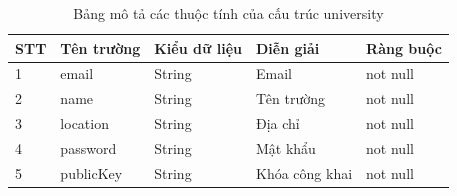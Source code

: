 \begin{table}[H]
\caption{Bảng mô tả các thuộc tính của cấu trúc university}
	\label{table:university}
	\begin{tabularx} {\textwidth} {|p{1cm}|p{3cm}|p{3cm}|X|p{2cm}|}
\hline
		STT &	Tên trường & Kiểu dữ liệu & Diễn giải & Ràng buộc \\ \hline
		1 & email	& String & Email  & not null \\ \hline
		2 & name & String  & Tên trường   & not null \\ \hline
		3 & location	&  String & Địa chỉ  &not null \\ \hline
		4 & password	& String & Mật khẩu  &not null \\ \hline
		5 & publicKey	& String & Khóa công khai   &not null \\ \hline
\end{tabularx}
\end{table}

